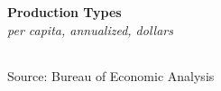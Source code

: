 \documentclass{report}
\begin{document}
\begin{minipage}{0.76\textwidth}

\normalsize \textbf{Production Types}\\
\footnotesize{\textit{per capita, annualized, dollars}}\\
\hspace{-2mm}  \setlength{\tabcolsep}{3.7pt} \color{black!90}
		{\renewcommand{\arraystretch}{1.55}
		 \begin{tabular}{p{38mm} R{12.8mm} R{12.8mm} R{12.8mm} R{12.8mm} R{12.8mm}}
			 \hline
		\end{tabular}}
\vspace{-2mm}

\footnotesize{Source: Bureau of Economic Analysis}
\end{minipage}
\newpage
\end{document}
